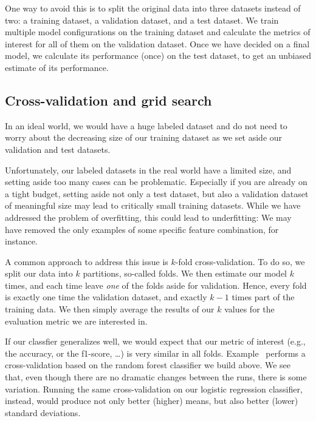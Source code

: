 One way to avoid this is to split the original data into three
datasets instead of two: a training dataset, a validation dataset, and
a test dataset.  We train multiple model configurations on the
training dataset and calculate the metrics of interest for all of them
on the validation dataset.  Once we have decided on a final model, we
calculate its performance (once) on the test dataset, to get an
unbiased estimate of its performance.



\subsection{Cross-validation and grid search}

In an ideal world, we would have a huge labeled dataset and do not
need to worry about the decreasing size of our training dataset as we
set aside our validation and test datasets.

Unfortunately, our labeled datasets in the real world have a limited
size, and setting aside too many cases can be problematic. Especially
if you are already on a tight budget, setting aside not only a test
dataset, but also a validation dataset of meaningful size may lead to
critically small training datasets. While we have addressed the
problem of overfitting, this could lead to underfitting: We may have
removed the only examples of some specific feature combination, for
instance.

A common approach to address this issue is $k$-fold
cross-validation. To do so, we split our data into $k$ partitions,
so-called folds. We then estimate our model $k$ times, and each time
leave \emph{one} of the folds aside for validation. Hence, every fold
is exactly one time the validation dataset, and exactly $k-1$ times
part of the training data. We then simply average the results of our
$k$ values for the evaluation metric we are interested in.

If our classfier generalizes well, we would expect that our metric of
interest (e.g., the accuracy, or the f1-score, \ldots) is very similar
in all folds. Example~ performs a cross-validation
based on the random forest classifier we build above. We see that,
even though there are no dramatic changes between the runs, there is
some variation. Running the same cross-validation on our logistic
regression classifier, instead, would produce not only better (higher)
means, but also better (lower) standard deviations.


